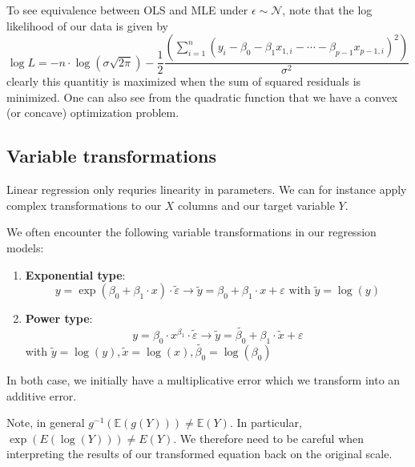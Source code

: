 \documentclass[11pt, %
	oneside, %
	english, %
	onehalfspacing, %
	]{article} %
\numberwithin{equation}{section}
\begin{document}
To see equivalence between OLS and MLE under $\epsilon \sim \mathcal{N}$, note that the log likelihood of our data is given by
\begin{equation*}
    \log L=-n \cdot \log (\sigma \sqrt{2 \pi})-\frac{1}{2} \frac{\left(\sum_{i=1}^n\left(y_i-\beta_0-\beta_1 x_{1, i}-\cdots-\beta_{p-1} x_{p-1, i}\right)^2\right)}{\sigma^2}
\end{equation*}
clearly this quantitiy is maximized when the sum of squared residuals is minimized. One can also see from the quadratic function that we have a convex (or concave) optimization problem.



\subsection{Variable transformations}

Linear regression only requries linearity in parameters. We can for instance apply complex transformations to our $X$ columns and our target variable $Y$.

We often encounter the following variable transformations in our regression models:
\begin{enumerate}
    \item \textbf{Exponential type}:
    \begin{equation*}
        y=\exp \left(\beta_0+\beta_1 \cdot x\right) \cdot \tilde{\varepsilon} \rightarrow \tilde{y}=\beta_0+\beta_1 \cdot x+\varepsilon \text { with } \tilde{y}=\log (y)
    \end{equation*}
    \item \textbf{Power type}:
    \begin{equation*}
        y=\beta_0 \cdot x^{\beta_1} \cdot \tilde{\varepsilon} \rightarrow \tilde{y}=\widetilde{\beta_0}+\beta_1 \cdot \tilde{x}+\varepsilon
    \end{equation*}
    with $\tilde{y}=\log (y), \tilde{x}=\log (x), \widetilde{\beta_0}=\log \left(\beta_0\right)$
\end{enumerate}
In both case, we initially have a multiplicative error which we transform into an additive error.

Note, in general $g^{-1} \left(\mathbb{E}(g(Y))\right) \neq \mathbb{E}(Y)$. In particular, $\exp (E(\log (Y))) \neq E(Y)$. We therefore need to be careful when interpreting the results of our transformed equation back on the original scale.
\end{document}
